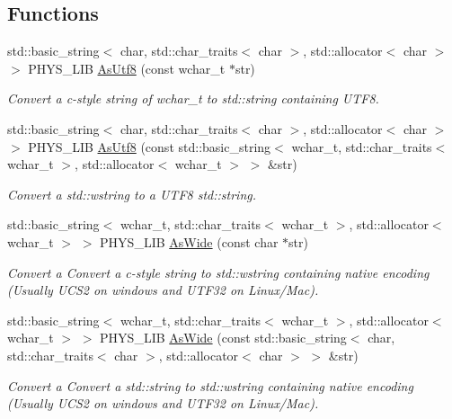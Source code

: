 \subsection*{Functions}
\begin{DoxyCompactItemize}
\item 
std::basic\_\-string$<$ char, std::char\_\-traits$<$ char $>$, std::allocator$<$ char $>$ $>$ PHYS\_\-LIB \hyperlink{namespacephys_1_1xml_a2d4bf28045544dc7350827f568cad46f}{AsUtf8} (const wchar\_\-t $\ast$str)
\begin{DoxyCompactList}\small\item\em Convert a c-\/style string of wchar\_\-t to std::string containing UTF8. \item\end{DoxyCompactList}\item 
std::basic\_\-string$<$ char, std::char\_\-traits$<$ char $>$, std::allocator$<$ char $>$ $>$ PHYS\_\-LIB \hyperlink{namespacephys_1_1xml_aa3d160a2965f60bc3b2f019be6c7d038}{AsUtf8} (const std::basic\_\-string$<$ wchar\_\-t, std::char\_\-traits$<$ wchar\_\-t $>$, std::allocator$<$ wchar\_\-t $>$ $>$ \&str)
\begin{DoxyCompactList}\small\item\em Convert a std::wstring to a UTF8 std::string. \item\end{DoxyCompactList}\item 
std::basic\_\-string$<$ wchar\_\-t, std::char\_\-traits$<$ wchar\_\-t $>$, std::allocator$<$ wchar\_\-t $>$ $>$ PHYS\_\-LIB \hyperlink{namespacephys_1_1xml_a0a57ef612f499a03733ca18d0e4f0c4f}{AsWide} (const char $\ast$str)
\begin{DoxyCompactList}\small\item\em Convert a Convert a c-\/style string to std::wstring containing native encoding (Usually UCS2 on windows and UTF32 on Linux/Mac). \item\end{DoxyCompactList}\item 
std::basic\_\-string$<$ wchar\_\-t, std::char\_\-traits$<$ wchar\_\-t $>$, std::allocator$<$ wchar\_\-t $>$ $>$ PHYS\_\-LIB \hyperlink{namespacephys_1_1xml_a7ca79461d40476ea4cde4f54dadffff4}{AsWide} (const std::basic\_\-string$<$ char, std::char\_\-traits$<$ char $>$, std::allocator$<$ char $>$ $>$ \&str)
\begin{DoxyCompactList}\small\item\em Convert a Convert a std::string to std::wstring containing native encoding (Usually UCS2 on windows and UTF32 on Linux/Mac). \item\end{DoxyCompactList}\item 

\end{DoxyCompactItemize}
